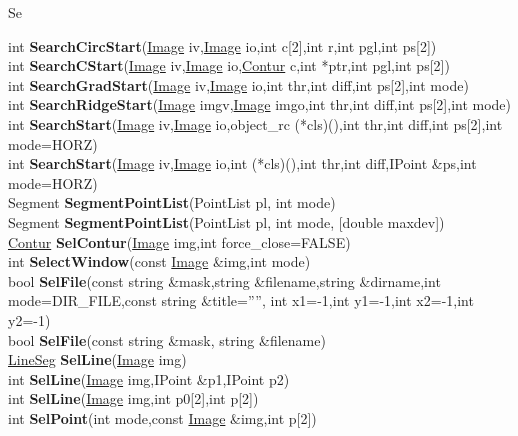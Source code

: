 \documentclass[10pt,titlepage]{article}
\def\functionlistentry#1#2#3#4#5#6{\noindent #1 {\bf #2}(#3) \dotfill #6\\}
\def\letterref#1{}
\def\letterlabel#1{\vspace{0.5cm}\centerline{\Large #1}}
\def\letterlabelend#1{}
\begin{document}
{{\letterlabel{Se}
\letterref{A}
\letterref{B}
\letterref{C}
\letterref{D}
\letterref{E}
\letterref{F}
\letterref{G}
\letterref{H}
\letterref{I}
\letterref{K}
\letterref{L}
\letterref{M}
\letterref{N}
\letterref{O}
\letterref{P}
\letterref{Q}
\letterref{R}
\letterref{S}
\letterref{T}
\letterref{U}
\letterref{V}
\letterref{W}
\letterref{X}
\letterref{Y}
\letterref{Z}

\letterref{Sc}
\letterref{Se}
\letterref{Sh}
\letterref{Si}
\letterref{Sk}
\letterref{Sm}
\letterref{So}
\letterref{Sp}
\letterref{Sq}
\letterref{St}
\letterref{Su}
\letterlabelend{Se}
\functionlistentry{int}{SearchCircStart}{\hyperlink{Image}{Image} iv,\hyperlink{Image}{Image} io,int c[2],int r,int pgl,int ps[2]}{447}{conturs}{}
\functionlistentry{int}{SearchCStart}{\hyperlink{Image}{Image} iv,\hyperlink{Image}{Image} io,\hyperlink{Contur}{Contur} c,int *ptr,int pgl,int ps[2]}{448}{conturs}{}
\functionlistentry{int}{SearchGradStart}{\hyperlink{Image}{Image} iv,\hyperlink{Image}{Image} io,int thr,int diff,int ps[2],int mode}{446}{conturs}{}
\functionlistentry{int}{SearchRidgeStart}{\hyperlink{Image}{Image} imgv,\hyperlink{Image}{Image} imgo,int thr,int diff,int ps[2],int mode}{451}{conturs}{}
\functionlistentry{int}{SearchStart}{\hyperlink{Image}{Image} iv,\hyperlink{Image}{Image} io,object\_rc (*cls)(),int thr,int diff,int ps[2],int mode=HORZ}{438}{conturs}{}
\functionlistentry{int}{SearchStart}{\hyperlink{Image}{Image} iv,\hyperlink{Image}{Image} io,int (*cls)(),int thr,int diff,IPoint \&ps,int mode=HORZ}{439}{conturs}{}
\functionlistentry{Segment}{SegmentPointList}{PointList pl, int mode}{1186}{fitting}{}
\functionlistentry{Segment}{SegmentPointList}{PointList pl, int mode, [double maxdev]}{1187}{fitting}{}
\functionlistentry{\hyperlink{Contur}{Contur}}{SelContur}{\hyperlink{Image}{Image} img,int force\_close=FALSE}{1341}{graphics}{}
\functionlistentry{int}{SelectWindow}{const \hyperlink{Image}{Image} \&img,int mode}{111}{Visualisierung}{}
\functionlistentry{bool}{SelFile}{const string \&mask,string \&filename,string \&dirname,int mode=DIR\_FILE,const string \&title='''', int x1=-1,int y1=-1,int x2=-1,int y2=-1}{1449}{genericTools}{}
\functionlistentry{bool}{SelFile}{const string \&mask, string \&filename}{1450}{genericTools}{}
\functionlistentry{\hyperlink{LineSeg}{LineSeg}}{SelLine}{\hyperlink{Image}{Image} img}{1338}{graphics}{}
\functionlistentry{int}{SelLine}{\hyperlink{Image}{Image} img,IPoint \&p1,IPoint p2}{1339}{graphics}{}
\functionlistentry{int}{SelLine}{\hyperlink{Image}{Image} img,int p0[2],int p[2]}{1340}{graphics}{}
\functionlistentry{int}{SelPoint}{int mode,const \hyperlink{Image}{Image} \&img,int p[2]}{102}{Visualisierung}{}
}}
\end{document}
